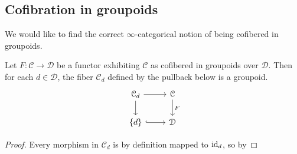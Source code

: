 \documentclass[main.tex]{subfiles}
\begin{document}
\subsection{Cofibration in groupoids}
\label{ssc:cofibration_in_groupoids}

We would like to find the correct $\infty$-categorical notion of being cofibered in groupoids.

\begin{lemma}
  \label{lemma:fiber_of_category_cofibered_in_groupoids_is_groupoid}
  Let $F\colon \mathcal{C} \to \mathcal{D}$ be a functor exhibiting $\mathcal{C}$ as cofibered in groupoids over $\mathcal{D}$. Then for each $d \in \mathcal{D}$, the fiber $\mathcal{C}_{d}$ defined by the pullback below is a groupoid.
  \begin{equation*}
    \begin{tikzcd}
      \mathcal{C}_{d}
      \arrow[r]
      \arrow[d]
      & \mathcal{C}
      \arrow[d, "F"]
      \\
      \{d\}
      \arrow[r, hookrightarrow]
      & \mathcal{D}
    \end{tikzcd}
  \end{equation*}
\end{lemma}
\begin{proof}
  Every morphism in $\mathcal{C}_{d}$ is by definition mapped to $\mathrm{id}_{d}$, so by
\end{proof}
\end{document}
